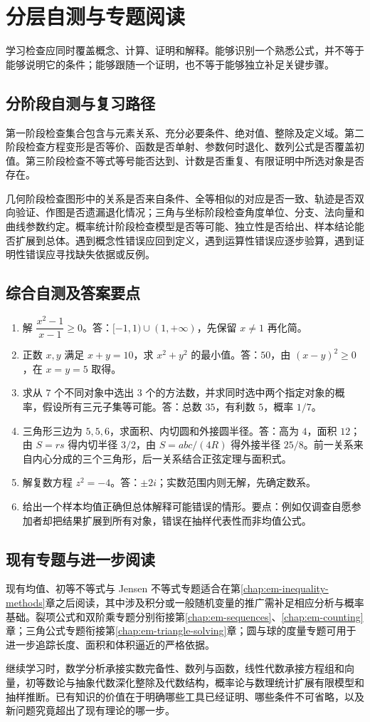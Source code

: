 \documentclass[UTF8]{ctexbook}
\begin{document}
\chapter{分层自测与专题阅读}
\label{app:em-study}
学习检查应同时覆盖概念、计算、证明和解释。能够识别一个熟悉公式，并不等于能够说明它的条件；能够跟随一个证明，也不等于能够独立补足关键步骤。

\section{分阶段自测与复习路径}
第一阶段检查集合包含与元素关系、充分必要条件、绝对值、整除及定义域。第二阶段检查方程变形是否等价、函数是否单射、参数何时退化、数列公式是否覆盖初值。第三阶段检查不等式等号能否达到、计数是否重复、有限证明中所选对象是否存在。

几何阶段检查图形中的关系是否来自条件、全等相似的对应是否一致、轨迹是否双向验证、作图是否遗漏退化情况；三角与坐标阶段检查角度单位、分支、法向量和曲线参数约定。概率统计阶段检查模型是否等可能、独立性是否给出、样本结论能否扩展到总体。遇到概念性错误应回到定义，遇到运算性错误应逐步验算，遇到证明性错误应寻找缺失依据或反例。

\section{综合自测及答案要点}
\begin{enumerate}
\item 解 $\dfrac{x^2-1}{x-1}\ge0$。答：$[-1,1)\cup(1,+\infty)$，先保留 $x\ne1$ 再化简。
\item 正数 $x,y$ 满足 $x+y=10$，求 $x^2+y^2$ 的最小值。答：$50$，由 $(x-y)^2\ge0$，在 $x=y=5$ 取得。
\item 求从 $7$ 个不同对象中选出 $3$ 个的方法数，并求同时选中两个指定对象的概率，假设所有三元子集等可能。答：总数 $35$，有利数 $5$，概率 $1/7$。
\item 三角形三边为 $5,5,6$，求面积、内切圆和外接圆半径。答：高为 $4$，面积 $12$；由 $S=rs$ 得内切半径 $3/2$，由 $S=abc/(4R)$ 得外接半径 $25/8$。前一关系来自内心分成的三个三角形，后一关系结合正弦定理与面积式。
\item 解复数方程 $z^2=-4$。答：$\pm2i$；实数范围内则无解，先确定数系。
\item 给出一个样本均值正确但总体解释可能错误的情形。要点：例如仅调查自愿参加者却把结果扩展到所有对象，错误在抽样代表性而非均值公式。
\end{enumerate}

\section{现有专题与进一步阅读}
现有均值、初等不等式与 Jensen 不等式专题适合在第\ref{chap:em-inequality-methods}章之后阅读，其中涉及积分或一般随机变量的推广需补足相应分析与概率基础。裂项公式和双阶乘专题分别衔接第\ref{chap:em-sequences}、\ref{chap:em-counting}章；三角公式专题衔接第\ref{chap:em-triangle-solving}章；圆与球的度量专题可用于进一步追踪长度、面积和体积逼近的严格依据。

继续学习时，数学分析承接实数完备性、数列与函数，线性代数承接方程组和向量，初等数论与抽象代数深化整除及代数结构，概率论与数理统计扩展有限模型和抽样推断。已有知识的价值在于明确哪些工具已经证明、哪些条件不可省略，以及新问题究竟超出了现有理论的哪一步。
\end{document}
